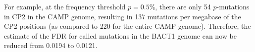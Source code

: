 For example, at the frequency threshold $p=0.5$\%, there are only 54 $p$-mutations in CP2 in the CAMP genome, resulting in 137 mutations per megabase of the CP2 positions (as compared to 220 for the entire CAMP genome). Therefore, the estimate of the FDR for called mutations in the BACT1 genome can now be reduced from 0.0194 to 0.0121.\endinput